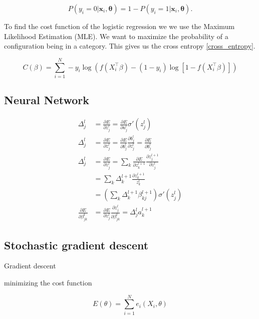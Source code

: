 \documentclass[a4paper,12pt, english]{article}
\begin{document}
\begin{equation*}
P(y_i = 0|\mathbf{x}_i,\mathbf{\theta}) = 1 - P(y_i = 1|\mathbf{x}_i,\mathbf{\theta}).
\end{equation*}

To find the cost function of the logistic regression we we use the Maximum Likelihood Estimation (MLE). We want to maximize the probability of a configuration being in a category. This gives us the cross entropy \ref{cross_entropy}.

\begin{equation} \label{cross_entropy}
C(\beta) = \sum_{i=1}^N -y_i \log (f(X_i^\top \beta) - (1 - y_i) \log [1 - f(X_i^\top \beta)])
\end{equation}

\subsection{Neural Network}

\begin{align}
\Delta_j^l &= \frac{\partial E}{\partial z_j^l} = \frac{\partial E}{\partial a_j^l} \sigma'(z_j^l) \\
\Delta_j^l &= \frac{\partial E}{\partial z_j^l} = \frac{\partial E}{\partial b_j^l} \frac{\partial b_j^l}{\partial z_j^l} = \frac{\partial E}{\partial b_j^l} \\
\Delta_j^l &= \frac{\partial E}{\partial z_j^l} = \sum_k \frac{\partial E}{\partial z_k^{l+1}} \frac{\partial z_j^{l+1}}{\partial z_j^l} \\
&= \sum_k \Delta_k^{l+1} \frac{\partial z_k^{l+1}}{z_k^l} \\
&= \left( \sum_k \Delta_k^{l+1} \beta_{kj}^{l+1} \right) \sigma'(z_j^l) \\
\frac{\partial E}{\partial \beta_{jk}^l} &= \frac{\partial E}{\partial z_j^l} \frac{\partial z_j^l}{\partial \beta_{jk}^l} = \Delta_j^l a_k^{l+1} 
\end{align}



\subsection{Stochastic gradient descent}

Gradient descent 

minimizing the cost function

\begin{equation}
E(\theta) = \sum_{i=1}^N e_i(X_i, \theta) 
\end{equation}
\end{document}
